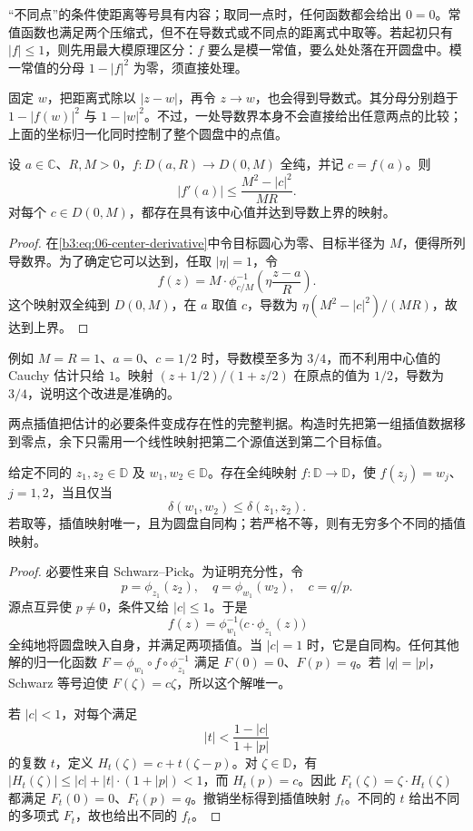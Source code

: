 “不同点”的条件使距离等号具有内容；取同一点时，任何函数都会给出 \(0=0\)。常值函数也满足两个压缩式，但不在导数式或不同点的距离式中取等。若起初只有 \(|f|\le1\)，则先用最大模原理区分：\(f\) 要么是模一常值，要么处处落在开圆盘中。模一常值的分母 \(1-|f|^2\) 为零，须直接处理。

\ProseParagraphBreak

固定 \(w\)，把距离式除以 \(|z-w|\)，再令 \(z\rightarrow w\)，也会得到导数式。其分母分别趋于 \(1-|f(w)|^2\) 与 \(1-|w|^2\)。不过，一处导数界本身不会直接给出任意两点的比较；上面的坐标归一化同时控制了整个圆盘中的点值。

\begin{proposition}[固定函数值的导数界]\label{b3:prop:06-value-derivative-bound}
设 \(a\in\mathbb C\)、\(R,M>0\)，\(f:D(a,R)\rightarrow D(0,M)\) 全纯，并记 \(c=f(a)\)。则
\[
 |f'(a)|\le\frac{M^2-|c|^2}{MR}.
\]
对每个 \(c\in D(0,M)\)，都存在具有该中心值并达到导数上界的映射。
\end{proposition}
\begin{proof}
在\eqref{b3:eq:06-center-derivative}中令目标圆心为零、目标半径为 \(M\)，便得所列导数界。为了确定它可以达到，任取 \(|\eta|=1\)，令
\[
 f(z)=M\cdot\phi_{c/M}^{-1}\left(\eta\frac{z-a}{R}\right).
\]
这个映射双全纯到 \(D(0,M)\)，在 \(a\) 取值 \(c\)，导数为 \(\eta(M^2-|c|^2)/(MR)\)，故达到上界。
\end{proof}

例如 \(M=R=1\)、\(a=0\)、\(c=1/2\) 时，导数模至多为 \(3/4\)，而不利用中心值的 Cauchy 估计只给 \(1\)。映射 \((z+1/2)/(1+z/2)\) 在原点的值为 \(1/2\)，导数为 \(3/4\)，说明这个改进是准确的。

\ProseParagraphBreak

两点插值把估计的必要条件变成存在性的完整判据。构造时先把第一组插值数据移到零点，余下只需用一个线性映射把第二个源值送到第二个目标值。

\begin{proposition}[两点插值]\label{b3:prop:06-two-point-interpolation}
给定不同的 \(z_1,z_2\in\mathbb D\) 及 \(w_1,w_2\in\mathbb D\)。存在全纯映射 \(f:\mathbb D\rightarrow\mathbb D\)，使 \(f(z_j)=w_j\)、\(j=1,2\)，当且仅当
\[
 \delta(w_1,w_2)\le\delta(z_1,z_2).
\]
若取等，插值映射唯一，且为圆盘自同构；若严格不等，则有无穷多个不同的插值映射。
\end{proposition}
\begin{proof}
必要性来自 Schwarz--Pick。为证明充分性，令
\[
 p=\phi_{z_1}(z_2),\quad q=\phi_{w_1}(w_2),\quad c=q/p.
\]
源点互异使 \(p\ne0\)，条件又给 \(|c|\le1\)。于是
\[
 f(z)=\phi_{w_1}^{-1}\bigl(c\cdot\phi_{z_1}(z)\bigr)
\]
全纯地将圆盘映入自身，并满足两项插值。当 \(|c|=1\) 时，它是自同构。任何其他解的归一化函数 \(F=\phi_{w_1}\circ f\circ\phi_{z_1}^{-1}\) 满足 \(F(0)=0\)、\(F(p)=q\)。若 \(|q|=|p|\)，Schwarz 等号迫使 \(F(\zeta)=c\zeta\)，所以这个解唯一。

若 \(|c|<1\)，对每个满足
\[
 |t|<\frac{1-|c|}{1+|p|}
\]
的复数 \(t\)，定义 \(H_t(\zeta)=c+t(\zeta-p)\)。对 \(\zeta\in\mathbb D\)，有 \(|H_t(\zeta)|\le|c|+|t|\cdot(1+|p|)<1\)，而 \(H_t(p)=c\)。因此 \(F_t(\zeta)=\zeta\cdot H_t(\zeta)\) 都满足 \(F_t(0)=0\)、\(F_t(p)=q\)。撤销坐标得到插值映射 \(f_t\)。不同的 \(t\) 给出不同的多项式 \(F_t\)，故也给出不同的 \(f_t\)。
\end{proof}

